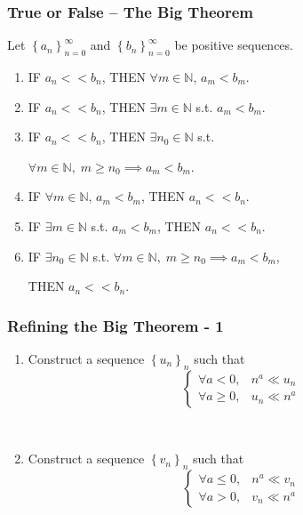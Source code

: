 \documentclass[14pt]{beamer}
\newcommand{\N}{\mathbb{N}}
\newcommand{\p}{\pause}
\newcommand{\azul}[1]{{\color{blue} #1}}
\newcommand{\rojo}[1]{{\color{red} #1}}
\newcommand{\setsize}[1]{\fontsize{#1}{#1}\selectfont} %
\newcommand{\smallerfont}{\setsize{13}} %
\newcommand{\an}{\left\{ a_n \right\}_{n=0}^{\infty}}
\newcommand{\bn}{\left\{ b_n \right\}_{n=0}^{\infty}}
\newcommand{\seqs}[1]{\left\{ #1_n \right\}_{n}}
\begin{document}
	\begin{frame}[t]
		\smallerfont
		\frametitle{True or False -- The Big Theorem}

		Let ${\displaystyle \an}$ and ${\displaystyle \bn}$ be positive sequences.
		\vspace{.15cm}
		\begin{enumerate}
			\item IF \; \rojo{${\displaystyle a_n << b_n}$}, \quad THEN \; \azul{${\displaystyle \forall m \in \N}$, ${\displaystyle a_m < b_m}$}.
				\vfill

			\item IF \; \rojo{${\displaystyle a_n << b_n}$}, \quad THEN \; \azul{${\displaystyle \exists m \in \N}$ s.t. ${\displaystyle a_m < b_m}$}.
				\vfill

			\item IF \; \rojo{${\displaystyle a_n << b_n}$}, \quad THEN \; \azul{${\displaystyle \exists n_0 \in \N}$ s.t.}
				\vspace{.15cm}

				\azul{ ${\displaystyle \forall m \in \N, \; m\geq n_0 \implies a_m < b_m}$}.
				\vfill
				\p

			\item IF \; \azul{${\displaystyle \forall m \in \N, \, a_m < b_m}$}, \quad
				THEN \; \rojo{${\displaystyle a_n << b_n}$}.
				\vfill

			\item IF \; \azul{${\displaystyle \exists m \in \N}$ s.t. ${\displaystyle a_m < b_m}$},
				\quad THEN \; \rojo{${\displaystyle a_n << b_n}$}.
				\vfill

			\item IF \; \azul{${\displaystyle \exists n_0 \in \N}$ s.t. ${\displaystyle \forall m \in \N, \; m\geq n_0 \implies a_m < b_m}$},
				\vspace{.15cm}

				THEN \; \rojo{${\displaystyle a_n << b_n}$}.
				\vfill
		\end{enumerate}
	\end{frame}
	\begin{frame}[t]
		\frametitle{Refining the Big Theorem - 1}

		\begin{enumerate}
			\item Construct a sequence ${\displaystyle \seqs{u}}$ such that
				\[
					\begin{cases}
						\forall a < 0,    & n^{a} \ll u_{n} \\
						\forall a \geq 0, & u_{n} \ll n^{a}
					\end{cases}
				\]

				\


			\item Construct a sequence ${\displaystyle \seqs{v}}$ such that
				\[
					\begin{cases}
						\forall a \leq 0, & n^{a} \ll v_{n} \\
						\forall a > 0,    & v_{n} \ll n^{a}
					\end{cases}
				\]
		\end{enumerate}
	\end{frame}
\end{document}
